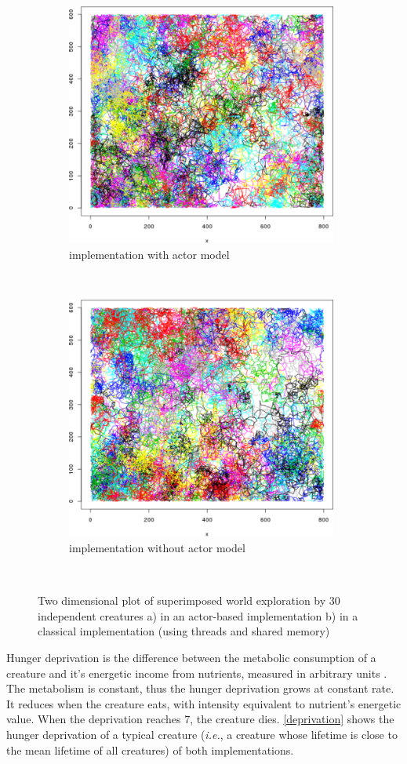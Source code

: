 \documentclass[runningheads]{llncs}
\begin{document}
\begin{figure}[h]
	\centering
	\begin{subfigure}[t]{1\textwidth}
		\centering
		\includegraphics[height=8cm]{images/tracingAkka}
		\caption{implementation with actor model}
		\label{trace:akka}
	\end{subfigure}%
	\\
	\begin{subfigure}[t]{1\textwidth}
		\centering
		\includegraphics[height=8cm]{images/tracingNoAkka}
		\caption{implementation without actor model}
		\label{trace:noAkka}
	\end{subfigure}%
	~
	\caption{Two dimensional plot of superimposed world exploration by 30 independent creatures a) in an actor-based implementation b) in a classical implementation (using threads and shared memory) }
	\label{tracing}
\end{figure}


Hunger deprivation is the difference between the metabolic consumption of a creature and it's energetic income from nutrients, measured in arbitrary units \cite{Campos}. The metabolism is constant, thus the hunger deprivation grows at constant rate. It reduces when the creature eats, with intensity equivalent to nutrient's energetic value. When the deprivation reaches 7, the creature dies. \autoref{deprivation} shows the hunger deprivation of a typical creature (\textit{i.e.}, a creature whose lifetime is close to the mean lifetime of all creatures) of both implementations. 
\end{document}
